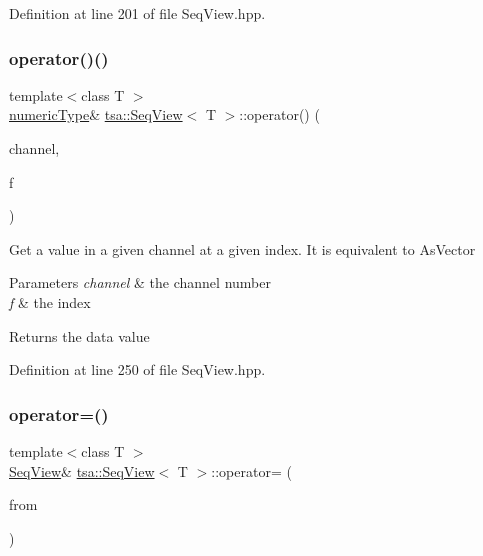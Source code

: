 Definition at line 201 of file Seq\+View.\+hpp.

\mbox{\label{classtsa_1_1_seq_view_ace64c1b40ce99c7905af99a0f5b1086f}} 
\subsubsection{\texorpdfstring{operator()()}{operator()()}\hspace{0.1cm}{\footnotesize\ttfamily [2/2]}}
{\footnotesize\ttfamily template$<$class T $>$ \\
\hyperlink{classtsa_1_1_seq_view_a72b689db78d0feea3305e62cc3852a1d}{numeric\+Type}\& \hyperlink{classtsa_1_1_seq_view}{tsa\+::\+Seq\+View}$<$ T $>$\+::operator() (\begin{DoxyParamCaption}\item[{unsigned int}]{channel,  }\item[{unsigned int}]{f }\end{DoxyParamCaption})\hspace{0.3cm}{\ttfamily [inline]}}

Get a value in a given channel at a given index. It is equivalent to As\+Vector


\begin{DoxyParams}{Parameters}
{\em channel} & the channel number \\
\hline
{\em f} & the index\\
\hline
\end{DoxyParams}
\begin{DoxyReturn}{Returns}
the data value 
\end{DoxyReturn}


Definition at line 250 of file Seq\+View.\+hpp.

\mbox{\label{classtsa_1_1_seq_view_ad7232128a9c94111d4f2ef1d02da7c55}} 
\subsubsection{\texorpdfstring{operator=()}{operator=()}}
{\footnotesize\ttfamily template$<$class T $>$ \\
\hyperlink{classtsa_1_1_seq_view}{Seq\+View}\& \hyperlink{classtsa_1_1_seq_view}{tsa\+::\+Seq\+View}$<$ T $>$\+::operator= (\begin{DoxyParamCaption}\item[{const \hyperlink{classtsa_1_1_seq_view}{Seq\+View}$<$ T $>$ \&}]{from }\end{DoxyParamCaption})\hspace{0.3cm}{\ttfamily [inline]}}

